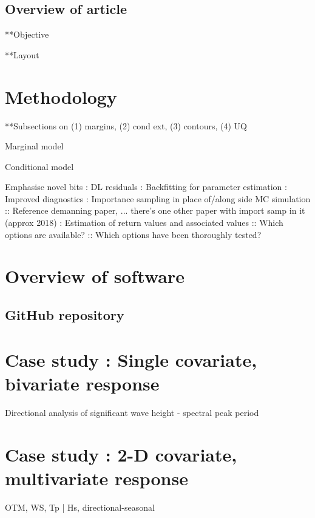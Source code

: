\documentclass[a4paper,fleqn]{cas-sc} %
\begin{document}
\subsection*{Overview of article}

\par ***Objective
\par ***Layout

\section{Methodology}

\par ***Subsections on (1) margins, (2) cond ext, (3) contours, (4) UQ
\par  Marginal model
\par  Conditional model
\par  Emphasise novel bits
: DL residuals
: Backfitting for parameter estimation
: Improved diagnostics 
: Importance sampling in place of/along side MC simulation
:: Reference demanning paper, ... there's one other paper with import samp in it (approx 2018)
: Estimation of return values and associated values
:: Which options are available?
:: Which options have been thoroughly tested?

\par 

\section{Overview of software}

\subsection*{GitHub repository}

\section{Case study : Single covariate, bivariate response}

\par Directional analysis of significant wave height - spectral peak period

\section{Case study : 2-D covariate, multivariate response}

\par OTM, WS, Tp | Hs, directional-seasonal
\end{document}

